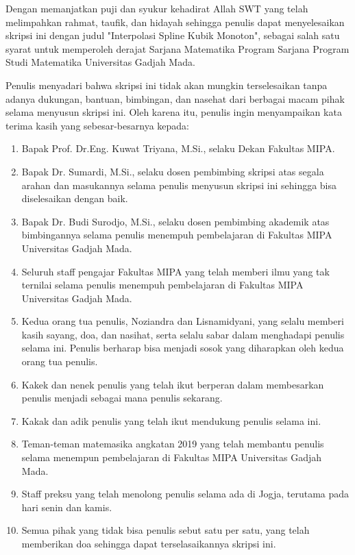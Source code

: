 \documentclass{skripsimathugm}
\begin{document}

Dengan memanjatkan puji dan syukur kehadirat Allah SWT yang telah melimpahkan rahmat, taufik, dan hidayah sehingga penulis dapat menyelesaikan skripsi ini dengan judul "Interpolasi Spline Kubik Monoton", sebagai salah satu syarat untuk memperoleh derajat Sarjana Matematika Program Sarjana Program Studi Matematika Universitas Gadjah Mada.

Penulis menyadari bahwa skripsi ini tidak akan mungkin terselesaikan tanpa adanya dukungan, bantuan, bimbingan, dan nasehat dari berbagai macam pihak selama menyusun skripsi ini. Oleh karena itu, penulis ingin menyampaikan kata terima kasih yang sebesar-besarnya kepada:
\begin{enumerate}
    \item Bapak Prof. Dr.Eng. Kuwat Triyana, M.Si., selaku Dekan Fakultas MIPA.
    \item Bapak Dr. Sumardi, M.Si., selaku dosen pembimbing skripsi atas segala arahan dan masukannya selama penulis menyusun skripsi ini sehingga bisa diselesaikan dengan baik.
    \item Bapak Dr. Budi Surodjo, M.Si., selaku dosen pembimbing akademik atas bimbingannya selama penulis menempuh pembelajaran di Fakultas MIPA Universitas Gadjah Mada.
    \item Seluruh staff pengajar Fakultas MIPA yang telah memberi ilmu yang tak ternilai selama penulis menempuh pembelajaran di Fakultas MIPA Universitas Gadjah Mada.
    \item Kedua orang tua penulis, Noziandra dan Lisnamidyani, yang selalu memberi kasih sayang, doa, dan nasihat, serta selalu sabar dalam menghadapi penulis selama ini. Penulis berharap bisa menjadi sosok yang diharapkan oleh kedua orang tua penulis.
    \item Kakek dan nenek penulis yang telah ikut berperan dalam membesarkan penulis menjadi sebagai mana penulis sekarang.
    \item Kakak dan adik penulis yang telah ikut mendukung penulis selama ini.
    \item Teman-teman matemasika angkatan 2019 yang telah membantu penulis selama menempun pembelajaran di Fakultas MIPA Universitas Gadjah Mada.
    \item Staff preksu yang telah menolong penulis selama ada di Jogja, terutama pada hari senin dan kamis.
    \item Semua pihak yang tidak bisa penulis sebut satu per satu, yang telah memberikan doa sehingga dapat terselasaikannya skripsi ini.
\end{enumerate}
\end{document}
